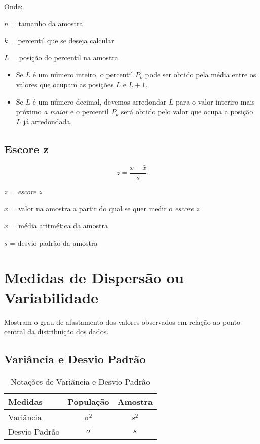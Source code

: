 \documentclass[
	12pt,
	a4paper
]{article}
\begin{document}
Onde:

\(n\) = tamanho da amostra

\(k\) = percentil que se deseja calcular	

\(L\) = posição do percentil na amostra

\begin{itemize}
    \item Se \(L\) é um número inteiro, o percentil \(P_k\) pode ser obtido pela média 			entre os valores que ocupam as posições \(L\) e \(L+1\).
    \item Se \(L\) é um número decimal, devemos arredondar \(L\) para o valor interiro 			mais próximo \emph{a maior} e o percentil \(P_k\) será obtido pelo valor que ocupa a 		posição \(L\) já arredondada.      
\end{itemize}

\subsection{Escore z}

\[z = \frac{x-\bar{x}}{s}\]

\(z\) = \emph{escore z}

\(x\) = valor na amostra a partir do qual se quer medir o \emph{escore z}

\(\bar{x}\) = média aritmética da amostra

\(s\) = desvio padrão da amostra

\section{Medidas de Dispersão ou Variabilidade}

Mostram o grau de afastamento dos valores observados em relação ao ponto central da distribuição dos dados.

\subsection{Variância e Desvio Padrão}

\begin{table}[h]
	\centering	
	\caption*{Notações de Variância e Desvio Padrão}
	\begin{tabular}{l|cc} 
		Medidas 		& População 	& Amostra 		\\
		\hline
		Variância		& \(\sigma^2 \)	& \(s^2\)	\\
		Desvio Padrão	& \(\sigma \)	& \(s\)
	\end{tabular}
\end{table}
\end{document}
